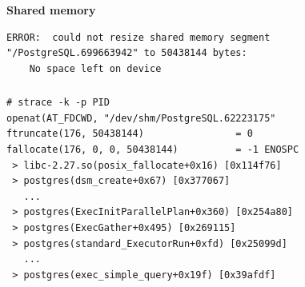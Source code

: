 \documentclass[usenames,dvipsnames, 18pt, compress, aspectratio=169]{beamer}
\begin{document}
\begin{frame}[fragile]{}
    \frametitle{}
    \begin{center}
    \textbf{Shared memory}

        \begin{verbatim}
ERROR:  could not resize shared memory segment
"/PostgreSQL.699663942" to 50438144 bytes:
    No space left on device
        \end{verbatim}

    \end{center}
\end{frame}

\begin{frame}[fragile]{}
    \frametitle{}
    \begin{center}

        \begin{verbatim}
# strace -k -p PID
openat(AT_FDCWD, "/dev/shm/PostgreSQL.62223175"
ftruncate(176, 50438144)                = 0
fallocate(176, 0, 0, 50438144)          = -1 ENOSPC
 > libc-2.27.so(posix_fallocate+0x16) [0x114f76]
 > postgres(dsm_create+0x67) [0x377067]
   ...
 > postgres(ExecInitParallelPlan+0x360) [0x254a80]
 > postgres(ExecGather+0x495) [0x269115]
 > postgres(standard_ExecutorRun+0xfd) [0x25099d]
   ...
 > postgres(exec_simple_query+0x19f) [0x39afdf]
        \end{verbatim}

    \end{center}
\end{frame}

\end{document}
